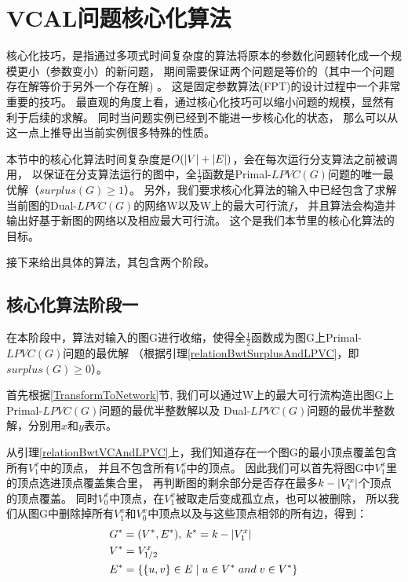 

\section{VCAL问题核心化算法} \label{KerneliseAlgorithm}
核心化技巧，是指通过多项式时间复杂度的算法将原本的参数化问题转化成一个规模更小（参数变小）的新问题，
期间需要保证两个问题是等价的（其中一个问题存在解等价于另外一个存在解) 。
这是固定参数算法(FPT)的设计过程中一个非常重要的技巧。
最直观的角度上看，通过核心化技巧可以缩小问题的规模，显然有利于后续的求解。
同时当问题实例已经到不能进一步核心化的状态，
那么可以从这一点上推导出当前实例很多特殊的性质。

本节中的核心化算法时间复杂度是$O(\left\vert V \right\vert + \left\vert E \right\vert)$，会在每次运行分支算法之前被调用，
以保证在分支算法运行的图中，全$\frac{1}{2}$函数是Primal-$LPVC(G)$问题的唯一最优解（$surplus(G) \ge 1$）。
另外，我们要求核心化算法的输入中已经包含了求解当前图的Dual-$LPVC(G)$的网络W以及W上的最大可行流$f$，
并且算法会构造并输出好基于新图的网络以及相应最大可行流。
这个是我们本节里的核心化算法的目标。

接下来给出具体的算法，其包含两个阶段。

\subsection{核心化算法阶段一}
在本阶段中，算法对输入的图G进行收缩，使得全$\frac{1}{2}$函数成为图G上Primal-$LPVC(G)$问题的最优解
（根据引理\ref{relationBwtSurplusAndLPVC}，即$surplus(G) \ge 0$）。
\vspace{0.5cm}

首先根据\ref{TransformToNetwork}节, 我们可以通过W上的最大可行流构造出图G上Primal-$LPVC(G)$问题的最优半整数解以及
Dual-$LPVC(G)$问题的最优半整数解，分别用$x$和$y$表示。

从引理\ref{relationBwtVCAndLPVC}上，我们知道存在一个图G的最小顶点覆盖包含所有$V^x_1$中的顶点，
并且不包含所有$V^x_0$中的顶点。
因此我们可以首先将图G中$V^x_1$里的顶点选进顶点覆盖集合里，
再判断图的剩余部分是否存在最多$k - \left\vert V^x_1 \right\vert$个顶点的顶点覆盖。
同时$V^x_0$中顶点，在$V^x_1$被取走后变成孤立点，也可以被删除，
所以我们从图G中删除掉所有$V^x_1$和$V^x_0$中顶点以及与这些顶点相邻的所有边，得到：
\begin{equation*}\begin{aligned}
    &G^* = (V^*, E^*),\;k^* = k - \left\vert V^x_1 \right\vert \\
    &V^* = V^x_{1/2} \\
    &E^* = \{\{u, v\} \in E\;|\;u \in V^*\;and\;v\in V^*\}
\end{aligned}\end{equation*}

